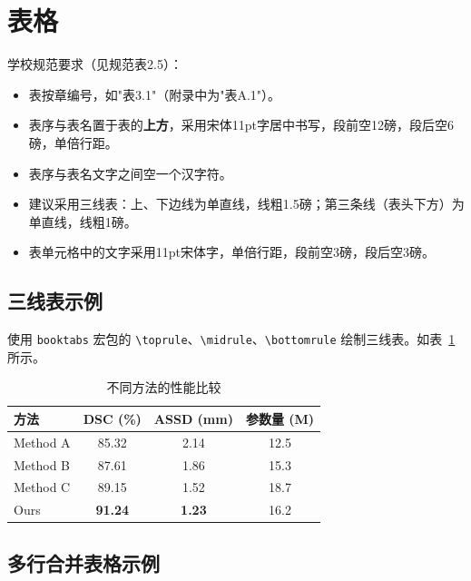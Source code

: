 \section{表格}\label{sec:demo-tables}

学校规范要求（见规范表2.5）：

\begin{itemize}
  \item 表按章编号，如"表3.1"（附录中为"表A.1"）。
  \item 表序与表名置于表的\textbf{上方}，采用宋体11pt字居中书写，段前空12磅，段后空6磅，单倍行距。
  \item 表序与表名文字之间空一个汉字符。
  \item 建议采用三线表：上、下边线为单直线，线粗1.5磅；第三条线（表头下方）为单直线，线粗1磅。
  \item 表单元格中的文字采用11pt宋体字，单倍行距，段前空3磅，段后空3磅。
\end{itemize}

\subsection{三线表示例}\label{subsec:demo-booktabs}

使用 \verb|booktabs| 宏包的 \verb|\toprule|、\verb|\midrule|、\verb|\bottomrule| 绘制三线表。如表~\ref{tab:demo-threeline} 所示。

\begin{table}[htbp]
  \centering
  \caption{不同方法的性能比较}
  \label{tab:demo-threeline}
  \begin{tabular}{lccc}
    \toprule
    方法 & DSC (\%) & ASSD (mm) & 参数量 (M) \\
    \midrule
    Method A & 85.32 & 2.14 & 12.5 \\
    Method B & 87.61 & 1.86 & 15.3 \\
    Method C & 89.15 & 1.52 & 18.7 \\
    Ours     & \textbf{91.24} & \textbf{1.23} & 16.2 \\
    \bottomrule
  \end{tabular}
\end{table}

\subsection{多行合并表格示例}\label{subsec:demo-multirow}

